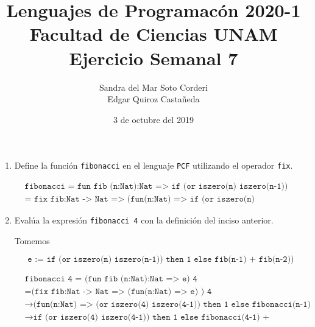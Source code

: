 \documentclass{article}
\title{
    Lenguajes de Programacón 2020-1\\
    Facultad de Ciencias UNAM\\
    Ejercicio Semanal 7
}
\author{
    Sandra del Mar Soto Corderi\\
    Edgar Quiroz Castañeda
}
\date{
    3 de octubre del 2019
}
\begin{document}
    \maketitle

    \begin{enumerate}
        \item {
            Define la función \texttt{fibonacci} en el lenguaje \texttt{PCF}
            utilizando el operador \texttt{fix}.

            \begin{align*}
                &\texttt{
                    fibonacci = 
                    fun fib (n:Nat):Nat =>           
                    if (or iszero(n) iszero(n-1)) then 1 else fib(n-1) + fib(n-2)
                }\\
                &\texttt{
                    = fix fib:Nat -> Nat
                    => (fun(n:Nat) 
                    => if (or iszero(n) iszero(n-1)) then 1 else fib(n-1) + fib(n-2))
                }
            \end{align*}
                
        }
        \item {
            Evalúa la expresión \texttt{fibonacci 4} con la definición del
            inciso anterior.

            Tomemos

            \[
                \texttt{e := if (or iszero(n) iszero(n-1)) then 1 else fib(n-1) + fib(n-2))}
            \]

            \begin{align*}
                &\texttt{
                    fibonacci 4 = 
                    (fun fib (n:Nat):Nat => e) 4
                } \\
                &=\texttt{
                    (fix fib:Nat -> Nat
                    => (fun(n:Nat) => e)
                    ) 4
                } \\
                &\rightarrow 
                \texttt{
                    (fun(n:Nat) => (or iszero(4) iszero(4-1))
                    then 1
                    else fibonacci(n-1) + fibonacci(n-1)) 4
                } \\
                &\rightarrow
                \texttt{
                    if (or iszero(4) iszero(4-1))
                    then 1 
                    else fibonacci(4-1) + fibonacci(4-2))
                }
            \end{align*}
        }
    \end{enumerate}
\end{document}

